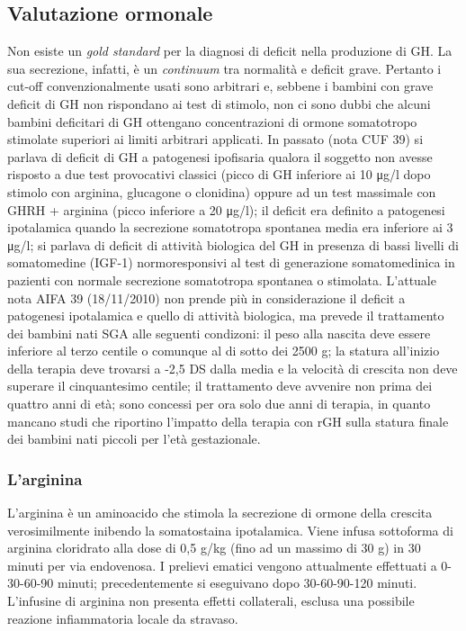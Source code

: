 \clearpage

\subsection{Valutazione ormonale}

Non esiste un \emph{gold standard} per la diagnosi di deficit nella produzione di GH\cite{gh2003update}. La sua secrezione, infatti, è un \emph{continuum} tra normalità e deficit grave. Pertanto i cut-off convenzionalmente usati sono arbitrari e, sebbene i bambini con grave deficit di GH non rispondano ai test di stimolo, non ci sono dubbi che alcuni bambini deficitari di GH ottengano concentrazioni di ormone somatotropo stimolate superiori ai limiti arbitrari applicati.
In passato (nota CUF 39) si parlava di deficit di GH a patogenesi ipofisaria qualora il soggetto non avesse risposto a due test provocativi classici (picco di GH inferiore ai 10 \unit{\micro g}/l dopo stimolo con arginina, glucagone o clonidina) oppure ad un test massimale con GHRH + arginina (picco inferiore a 20 \unit{\micro g}/l); il deficit era definito a patogenesi ipotalamica quando la secrezione somatotropa spontanea media era inferiore ai 3 \unit{\micro g}/l; si parlava di deficit di attività biologica del GH in presenza di bassi livelli di somatomedine (IGF-1) normoresponsivi al test di generazione somatomedinica in pazienti con normale secrezione somatotropa spontanea o stimolata.
L'attuale nota AIFA 39 (18/11/2010) non prende più in considerazione il deficit a patogenesi ipotalamica e quello di attività biologica, ma prevede il trattamento dei bambini nati SGA alle seguenti condizoni: il peso alla nascita deve essere inferiore al terzo centile o comunque al di sotto dei 2500 g; la statura all'inizio della terapia deve trovarsi a -2,5 DS dalla media e la velocità di crescita non deve superare il cinquantesimo centile; il trattamento deve avvenire non prima dei quattro anni di età; sono concessi per ora solo due anni di terapia, in quanto mancano studi che riportino l'impatto della terapia con rGH sulla statura finale dei bambini nati piccoli per l'età gestazionale.

\subsubsection*{L'arginina}
L'arginina è un aminoacido che stimola la secrezione di ormone della crescita verosimilmente inibendo la somatostaina ipotalamica. Viene infusa sottoforma di arginina cloridrato alla dose di 0,5 g/kg (fino ad un massimo di 30 g) in 30 minuti per via endovenosa. I prelievi ematici vengono attualmente effettuati a 0-30-60-90 minuti; precedentemente si eseguivano dopo 30-60-90-120 minuti. L'infusine di arginina non presenta effetti collaterali, esclusa una possibile reazione infiammatoria locale da stravaso.

